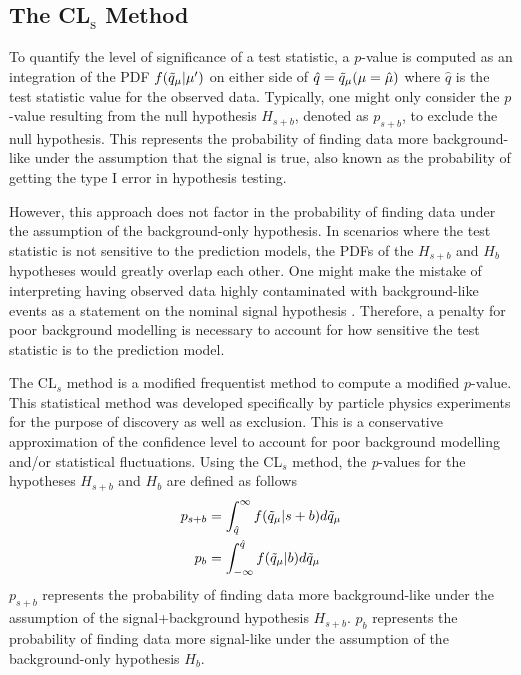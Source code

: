 \subsection{The CL$_{\mathrm{s}}$ Method}
\label{sec:cls}

To quantify the level of significance of a test statistic, a $p$-value is computed as an integration of the PDF $f(\Tilde{q}_{\mu}|\mu^{\prime})$ on either side of $\hat{q} = \Tilde{q}_{\mu}(\mu = \hat{\mu}) $ where $\hat{q}$ is the test statistic value for the observed data.
Typically, one might only consider the $p$-value resulting from the null hypothesis $H_{s+b}$, denoted as $p_{s+b}$, to exclude the null hypothesis.
This represents the probability of finding data more background-like under the assumption that the signal is true, also known as the probability of getting the type I error in hypothesis testing.



However, this approach does not factor in the probability of finding data under the assumption of the background-only hypothesis.
In scenarios where the test statistic is not sensitive to the prediction models, the PDFs of the $H_{s+b}$ and $H_b$ hypotheses would greatly overlap each other.
One might make the mistake of interpreting having observed data highly contaminated with background-like events as a statement on the nominal signal hypothesis \cite{CLs_Read}.
Therefore, a penalty for poor background modelling is necessary to account for how sensitive the test statistic is to the prediction model.

The CL$_s$ method is a modified frequentist method to compute a modified $p$-value.
This statistical method was developed specifically by particle physics experiments for the purpose of discovery as well as exclusion. This is a conservative approximation of the confidence level to account for poor background modelling and/or statistical fluctuations.
Using the CL$_{s}$ method, the \textit{p}-values for the hypotheses $H_{s+b}$ and $H_b$ are defined as follows \cite{asymptotic_test, CLs_Junk, CLs_Read}
\begin{align}
\label{eq:psb}
    p_{s+b} & = \int_{\hat{q}}^{\infty} f(\Tilde{q}_\mu|s+b) d\Tilde{q}_\mu \\
\label{eq:pb}
    p_{b} & = \int^{\hat{q}}_{-\infty} f(\Tilde{q}_\mu|b) d\Tilde{q}_\mu
\end{align}
$p_{s+b}$ represents the probability of finding data more background-like under the assumption of the signal+background hypothesis $H_{s+b}$.
$p_b$ represents the probability of finding data more signal-like under the assumption of the background-only hypothesis $H_b$.

